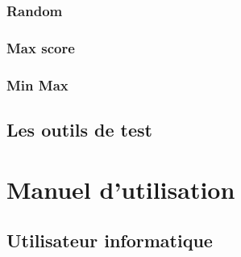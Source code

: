 \documentclass{report}
\begin{document}
		\section{Random}
		\section{Max score}
		\section{Min Max}

	\chapter{Les outils de test}

\part{Manuel d'utilisation}
	\chapter{Utilisateur informatique}
\end{document}
